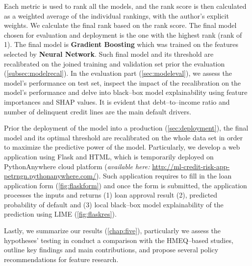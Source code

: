 Each metric is used to rank all the models, and the rank score is then calculated as a weighted average of the individual rankings, with the author's explicit weights. We calculate the final rank based on the rank score.
The final model chosen for evaluation and deployment is the one with the highest rank (rank of 1). 
The final model is \textbf{Gradient Boosting} which was trained on the features selected by \textbf{Neural Network}.
Such final model and its threshold are recalibrated on the joined training and validation set prior the evaluation (\autoref{subsec:modelrecal}).
In the evaluation part (\autoref{sec:modeleval}), we assess the model's performance on test set, inspect the impact of the recalibration on the model's performance and delve into black--box model explainability using feature importances and SHAP values.
It is evident that debt--to--income ratio and number of delinquent credit lines are the main default drivers.

Prior the deployment of the model into a production (\autoref{sec:deployment}), the final model and its optimal threshold are recalibrated on the whole data set in order to maximize the predictive power of the model.
Particularly, we develop a web application using Flask and HTML, which is temporarily deployed on PythonAnywhere cloud platform (\textit{available here:} \url{http://ml-credit-risk-app-petrngn.pythonanywhere.com/}).
Such application requires to fill in the loan application form  (\autoref{fig:flaskform}) and once the form is submitted, the application processes the inputs and returns (1) loan approval result (2), predicted probability of default and (3) local black--box model explainability of the prediction using LIME (\autoref{fig:flaskres}).

Lastly, we summarize our results (\autoref{chap:five}), particularly we assess the hypotheses' testing in conduct a comparison with the HMEQ--based studies, outline key findings and main contributions, and propose several policy recommendations for feature research.